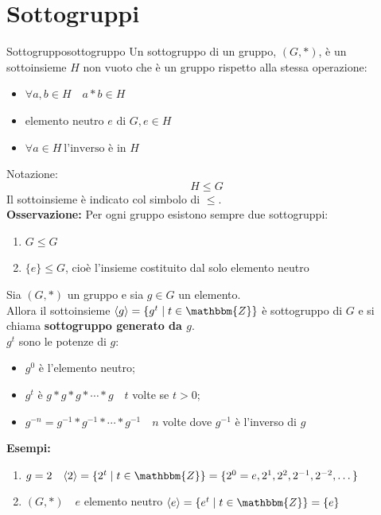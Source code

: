 \documentclass[12pt, letterpaper]{report}
\newcounter{theorem}
\newcounter{definition}
\newcommand{\nmu}{}
\begin{document}
		\section{Sottogruppi}
		\begin{definition}{\nmu Sottogruppo}{sottogruppo}
			Un sottogruppo di un gruppo, $(G, *)$, è un sottoinsieme $H$ non vuoto che è un gruppo rispetto alla stessa operazione:
			\begin{itemize}
				\item $\forall a,b \in H \quad a*b \in H$
				\item $\text{elemento neutro $e$ di $G$}, e \in H$
				\item $\forall a \in H\ \text{l'inverso è in $H$}$
			\end{itemize}
			Notazione:
			\[
			H \leq G
			\]
			Il sottoinsieme è indicato col simbolo di $\leq$. \\
			\textbf{Osservazione:} Per ogni gruppo esistono sempre due sottogruppi:
			\begin{enumerate}
				\item $G \leq G$
				\item $\{e\} \leq G$, cioè l'insieme costituito dal solo elemento neutro
			\end{enumerate}
		\end{definition}
		\begin{theorem}{}{}
			Sia $(G, *)$ un gruppo e sia $g \in G$ un elemento. \\
			Allora il sottoinsieme $\langle g\rangle = \{g^t \mid t \in \mathbbm{Z}\}$ è sottogruppo di $G$ e si chiama \textbf{sottogruppo generato da $g$}. \\
			$g^t$ sono le potenze di $g$:
			\begin{itemize}
				\item $g^0$ è l'elemento neutro;
				\item $g^t$ è $g * g * g * \cdots * g \quad t$ volte se $t > 0$;
				\item $g^{-n} = g^{-1} * g^{-1} * \cdots * g^{-1} \quad n$ volte dove $g^{-1}$ è l'inverso di $g$
			\end{itemize}
		\end{theorem}
		\textbf{Esempi:}
		\begin{enumerate}
			\item $g = 2 \quad \langle2\rangle = \{2^t \mid t \in \mathbbm{Z}\} = \{2^0 = e, 2^1, 2^2, 2^{-1}, 2^{-2}, \dots \}$
			\item $(G, *) \quad e$ elemento neutro $\langle e \rangle = \{e^t \mid t \in \mathbbm{Z}\} = \{e\}$
		\end{enumerate}
\end{document}
